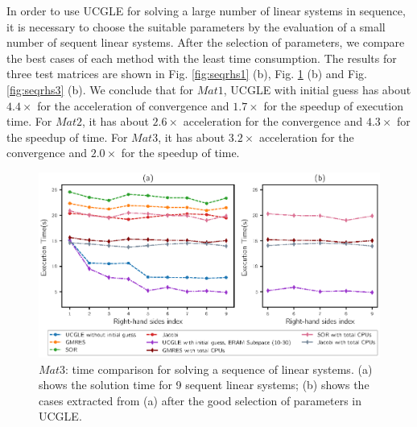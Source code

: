 In order to use UCGLE for solving a large number of linear systems in sequence, it is necessary to choose the suitable parameters by the evaluation of a small number of sequent linear systems. After the selection of parameters, we compare the best cases of each method with the least time consumption. The results for three test matrices are shown in Fig. \ref{fig:seqrhs1} (b), Fig. \ref{fig:seqrhs2} (b) and Fig. \ref{fig:seqrhs3} (b). We conclude that for $Mat1$, UCGLE with initial guess has about $4.4\times$ for the acceleration of convergence and $1.7\times$ for the speedup of execution time. For $Mat2$, it has about $2.6\times$ acceleration for the convergence and $4.3\times$ for the speedup of time. For $Mat3$, it has about $3.2\times$ acceleration for the convergence and $2.0\times$ for the speedup of time. 

\begin{figure}[htbp]
	\centering
	\includegraphics[width=6.4in]{fig/seqrhs2.eps}
	\caption{$Mat3$: time comparison for solving a sequence of linear systems. (a) shows the solution time for 9 sequent linear systems; (b) shows the cases extracted from (a) after the good selection of parameters in UCGLE.}
	\label{fig:seqrhs2}
\end{figure}


